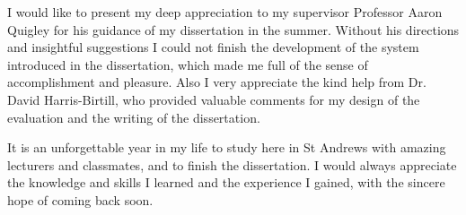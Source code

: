 \begin{acknowledgements}
I would like to present my deep appreciation to my supervisor Professor Aaron Quigley for his guidance of my dissertation in the summer. Without his directions and insightful suggestions I could not finish the development of the system introduced in the dissertation, which made me full of the sense of accomplishment and pleasure. Also I very appreciate the kind help from Dr. David Harris-Birtill, who provided valuable comments for my design of the evaluation and the writing of the dissertation.

It is an unforgettable year in my life to study here in St Andrews with amazing lecturers and classmates, and to finish the dissertation. I would always appreciate the knowledge and skills I learned and the experience I gained, with the sincere hope of coming back soon.
\end{acknowledgements}
